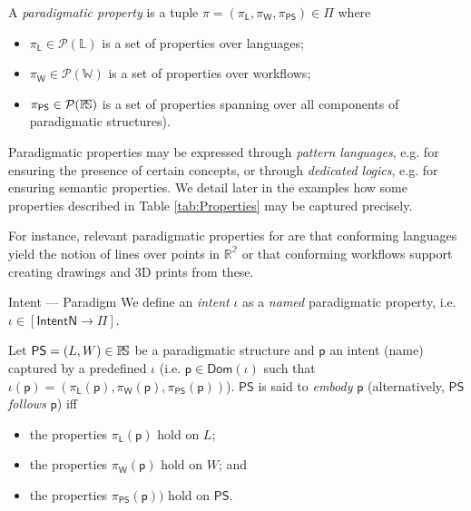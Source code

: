 \begin{Definition}
   A \emph{paradigmatic property} is a tuple 
$\pi = (\pi_{\mathsf{L}},\pi_{\mathsf{W}},\pi_{\mathsf{PS}}) \in \Pi$ where
\begin{itemize}
   \item $\pi_{\mathsf{L}} \in \mathcal{P}(\mathbb{L})$ is a set of properties 
over languages;
   \item $\pi_{\mathsf{W}} \in \mathcal{P}(\mathbb{W})$ is a set of properties 
over workflows;
   \item $\pi_{\mathsf{PS}}\in\mathcal{P}(\mathbb{P}\!\mathbb{S})$ is a set of 
properties spanning over all components of paradigmatic structures).
\end{itemize}
\end{Definition}
\noindent
Paradigmatic properties may be expressed through \emph{pattern languages}, e.g. 
for ensuring the presence of certain concepts, or through \emph{dedicated 
logics}, e.g. for ensuring semantic properties. We detail later in the examples 
how some properties described in Table \ref{tab:Properties} may be captured 
precisely.
\begin{newdef}
For instance, relevant paradigmatic properties for \PCAD are that conforming 
languages yield the notion of lines over points in $\mathbb{R^2}$ or that 
conforming workflows support creating drawings and 3D prints from these. 
\end{newdef}

\begin{Definition}{\label{def:Paradigm}Intent --- Paradigm}
   We define an \emph{intent} $\iota$ as a \emph{named} paradigmatic property, 
i.e. $\iota \in [\mathsf{IntentN} \to \Pi]$.

   Let $\mathsf{PS} = (L, W)\in\mathbb{P}\!\mathbb{S}$ be a paradigmatic structure and 
$\mathsf{p}$ an intent (name) captured by a predefined $\iota$ (i.e. 
$\mathsf{p}\in \mathsf{Dom}(\iota)$ such that 
$\iota(\mathsf{p}) = (\pi_{\mathsf{L}}(\mathsf{p}), 
                     \pi_{\mathsf{W}}(\mathsf{p}), 
                     \pi_{\mathsf{PS}}(\mathsf{p}))$). 
$\mathsf{PS}$ is said to \emph{embody} $\mathsf{p}$ (alternatively, 
$\mathsf{PS}$ \emph{follows} $\mathsf{p}$) iff 
\begin{itemize}
   \item the properties $\pi_{\mathsf{L}}(\mathsf{p})$ hold on $L$;
   \item the properties $\pi_{\mathsf{W}}(\mathsf{p})$ hold on $W$; and
   \item the properties $ \pi_{\mathsf{PS}}(\mathsf{p}))$ hold on $\mathsf{PS}$.
\end{itemize}
\end{Definition}

\begin{Example}
\end{Example}
